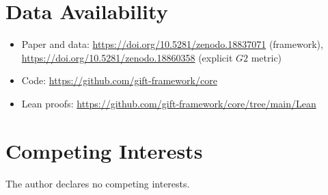 \documentclass[11pt,a4paper]{article}
\newcommand{\Gtwo}{\mathrm{G}_2}
\def\Gtwo{G2}%
\begin{document}
\section*{Data Availability}

\begin{itemize}
\item Paper and data: \url{https://doi.org/10.5281/zenodo.18837071} (framework), \url{https://doi.org/10.5281/zenodo.18860358} (explicit $\Gtwo$ metric)
\item Code: \url{https://github.com/gift-framework/core}
\item Lean proofs: \url{https://github.com/gift-framework/core/tree/main/Lean}
\end{itemize}

\section*{Competing Interests}

The author declares no competing interests.

\newpage
\end{document}
